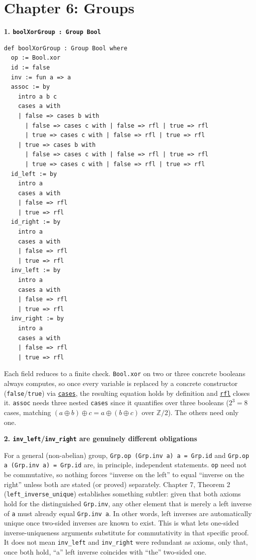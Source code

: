 \section{Chapter 6: Groups}\label{sec:14-appendix-solutions:05-chapter-6:1}

\textbf{1. \texttt{boolXorGroup : Group Bool}}

\begin{lstlisting}
def boolXorGroup : Group Bool where
  op := Bool.xor
  id := false
  inv := fun a => a
  assoc := by
    intro a b c
    cases a with
    | false => cases b with
      | false => cases c with | false => rfl | true => rfl
      | true => cases c with | false => rfl | true => rfl
    | true => cases b with
      | false => cases c with | false => rfl | true => rfl
      | true => cases c with | false => rfl | true => rfl
  id_left := by
    intro a
    cases a with
    | false => rfl
    | true => rfl
  id_right := by
    intro a
    cases a with
    | false => rfl
    | true => rfl
  inv_left := by
    intro a
    cases a with
    | false => rfl
    | true => rfl
  inv_right := by
    intro a
    cases a with
    | false => rfl
    | true => rfl
\end{lstlisting}

Each field reduces to a finite check. \texttt{Bool.xor} on two or three concrete booleans always computes, so once every variable is replaced by a concrete constructor (\texttt{false}/\texttt{true}) via \href{https://lean-lang.org/doc/reference/latest/Tactic-Proofs/Tactic-Reference/}{\texttt{cases}}, the resulting equation holds by definition and \href{https://lean-lang.org/doc/reference/latest/Tactic-Proofs/Tactic-Reference/}{\texttt{rfl}} closes it. \texttt{assoc} needs three nested \texttt{cases} since it quantifies over three booleans (\(2^3 = 8\) cases, matching \((a \oplus b) \oplus c = a \oplus (b \oplus c)\) over \(\mathbb{Z}/2\)). The others need only one.

\textbf{2. \texttt{inv\_\allowbreak{}left}/\texttt{inv\_\allowbreak{}right} are genuinely different obligations}

For a general (non-abelian) group, \texttt{Grp.op (Grp.inv a) a = Grp.id} and \texttt{Grp.op a (Grp.inv a) = Grp.id} are, in principle, independent statements. \texttt{op} need not be commutative, so nothing forces ``inverse on the left'' to equal ``inverse on the right'' unless both are stated (or proved) separately. Chapter 7, Theorem 2 (\texttt{left\_\allowbreak{}inverse\_\allowbreak{}unique}) establishes something subtler: given that both axioms hold for the distinguished \texttt{Grp.inv}, any other element that is merely a left inverse of \texttt{a} must already equal \texttt{Grp.inv a}. In other words, left inverses are automatically unique once two-sided inverses are known to exist. This is what lets one-sided inverse-uniqueness arguments substitute for commutativity in that specific proof. It does not mean \texttt{inv\_\allowbreak{}left} and \texttt{inv\_\allowbreak{}right} were redundant as axioms, only that, once both hold, ``a'' left inverse coincides with ``the'' two-sided one.
